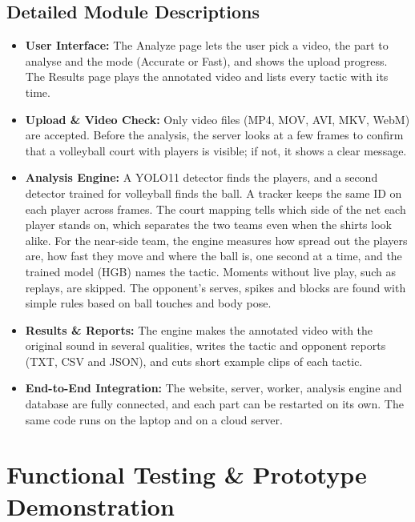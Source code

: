 \documentclass[11pt, a4paper]{article}
\begin{document}
\subsection{Detailed Module Descriptions}
\begin{itemize}[noitemsep, topsep=2pt]
    \item \textbf{User Interface:} The Analyze page lets the user pick a video, the part to analyse and the mode (Accurate or Fast), and shows the upload progress. The Results page plays the annotated video and lists every tactic with its time.
    \item \textbf{Upload \& Video Check:} Only video files (MP4, MOV, AVI, MKV, WebM) are accepted. Before the analysis, the server looks at a few frames to confirm that a volleyball court with players is visible; if not, it shows a clear message.
    \item \textbf{Analysis Engine:} A YOLO11 detector finds the players, and a second detector trained for volleyball finds the ball. A tracker keeps the same ID on each player across frames. The court mapping tells which side of the net each player stands on, which separates the two teams even when the shirts look alike. For the near-side team, the engine measures how spread out the players are, how fast they move and where the ball is, one second at a time, and the trained model (HGB) names the tactic. Moments without live play, such as replays, are skipped. The opponent's serves, spikes and blocks are found with simple rules based on ball touches and body pose.
    \item \textbf{Results \& Reports:} The engine makes the annotated video with the original sound in several qualities, writes the tactic and opponent reports (TXT, CSV and JSON), and cuts short example clips of each tactic.
    \item \textbf{End-to-End Integration:} The website, server, worker, analysis engine and database are fully connected, and each part can be restarted on its own. The same code runs on the laptop and on a cloud server.
\end{itemize}

\section{Functional Testing \& Prototype Demonstration}
\end{document}
